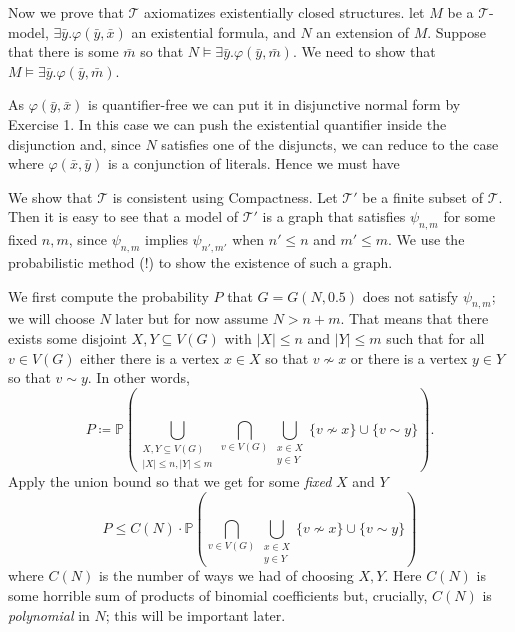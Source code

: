 \documentclass{article}
\begin{document}
\begin{enumerate}[leftmargin=*]
		Now we prove that $\mathcal{T}$ axiomatizes existentially closed structures. let $M$ be a $\mathcal{T}$-model, $\exists \bar{y}. \varphi(\bar{y},\bar{x})$ an existential formula, and $N$ an extension of $M$. Suppose that there is some $\bar{m}$ so that $N \models \exists \bar{y}. \varphi(\bar{y},\bar{m})$. We need to show that $M\models \exists \bar{y}. \varphi(\bar{y},\bar{m})$.
		
		As $\varphi(\bar{y},\bar{x})$ is quantifier-free we can put it in disjunctive normal form by Exercise 1. In this case we can push the existential quantifier inside the disjunction and, since $N$ satisfies one of the disjuncts, we can reduce to the case where $\varphi(\bar{x},\bar{y})$ is a conjunction of literals. Hence we must have
		
		We show that $\mathcal{T}$ is consistent using Compactness. Let $\mathcal{T}'$ be a finite subset of $\mathcal{T}$. Then it is easy to see that a model of $\mathcal{T}'$ is a graph that satisfies $\psi_{n,m}$ for some fixed $n,m$, since $\psi_{n,m}$ implies $\psi_{n',m'}$ when $n'\leq n$ and $m'\leq m$. We use the probabilistic method (!) to show the existence of such a graph.
		
		We first compute the probability $P$ that $G = G(N,0.5)$ does not satisfy $\psi_{n,m}$; we will choose $N$ later but for now assume $N> n+m$. That means that there exists some disjoint $X,Y \subseteq V(G)$ with $|X|\leq n$ and $|Y| \leq m$ such that for all $v\in V(G)$ either there is a vertex $x\in X$ so that $v\nsim x$ or there is a vertex $y\in Y$ so that $v\sim y$. In other words,
		\[
			P \coloneqq \mathbb{P}\left(\bigcup_{\substack{X,Y\subseteq V(G)\\ |X|\leq n, |Y|\leq m}} \bigcap_{v\in V(G)} \bigcup_{\substack{x\in X \\ y\in Y}} \{v\nsim x\}\cup \{v\sim y\} \right).
		\]
		Apply the union bound so that we get for some \emph{fixed} $X$ and $Y$
		\[
			P \leq C(N)\cdot\mathbb{P}\left(\bigcap_{v\in V(G)} \bigcup_{\substack{x\in X \\ y\in Y}} \{v\nsim x\}\cup \{v\sim y\}\right)
		\]
		where $C(N)$ is the number of ways we had of choosing $X,Y$. Here $C(N)$ is some horrible sum of products of binomial coefficients but, crucially, $C(N)$ is \emph{polynomial} in $N$; this will be important later.
		

\end{enumerate}
\end{document}
